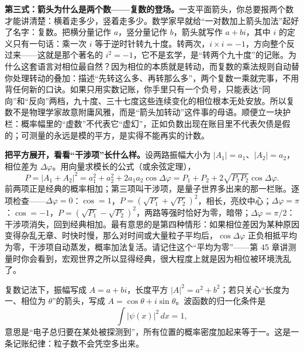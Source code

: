 
\textbf{第三式：箭头为什么是两个数——复数的登场。}一支平面箭头，你总要报两个数才能讲清楚：横着走多少，竖着走多少。数学家早就给“一对数加上箭头加法”起好了名字：复数。把横分量记作 \(a\)，竖分量记作 \(b\)，箭头就写作 \(a + bi\)，其中 \(i\) 的定义只有一句话：乘一次 \(i\) 等于逆时针转九十度。转两次，\(i \times i = -1\)，方向整个反过来——这就是那个著名的 \(i^2 = -1\)，它不是玄学，是“转两个九十度”的记账。为什么这套语言对相位最自然？因为相位的本质就是转动，而复数的乘法规则自动替你处理转动的叠加：描述“先转这么多、再转那么多”，两个复数一乘就完事，不用背任何新的口诀。如果只用实数记账，你手里只有一个负号，只能表达“同向”和“反向”两档，九十度、三十七度这些连续变化的相位根本无处安放。所以复数不是物理学家故意附庸风雅，而是“箭头加转动”这件事的母语。顺便立一块护栏：概率幅里的“虚数”不代表它“虚幻”，正如负数出现在账目里不代表欠债是假的；可测量的永远是模的平方，是实得不能再实的计数。

\begin{mathbridge}
\textbf{把平方展开，看看“干涉项”长什么样。}设两路振幅大小为 \(|A_1| = a_1\)、\(|A_2| = a_2\)，相位差为 \(\Delta\varphi\)。用向量求模长的公式（或余弦定理），
\[
P = |A_1 + A_2|^2 = a_1^2 + a_2^2 + 2a_1a_2\cos\Delta\varphi
   = P_1 + P_2 + 2\sqrt{P_1P_2}\cos\Delta\varphi.
\]
前两项正是经典的概率相加；第三项叫干涉项，是量子世界多出来的那一栏账。逐项检查——\(\Delta\varphi = 0\)：\(\cos = 1\)，\(P = (\sqrt{P_1}+\sqrt{P_2})^2\)，相长，亮纹中心；\(\Delta\varphi = \pi\)：\(\cos = -1\)，\(P = (\sqrt{P_1}-\sqrt{P_2})^2\)，两路等强时恰好为零，暗带；\(\Delta\varphi = \pi/2\)：干涉项消失，回到经典相加。最有意思的是第四种情形：如果相位差因为某种原因变得杂乱无章、时快时慢，那么对时间或大量粒子平均后，\(\cos\Delta\varphi\) 正负相抵平均为零，干涉项自动蒸发，概率加法复活。请记住这个“平均为零”——第 45 章讲测量时你会看到，宏观世界之所以显得经典，很大程度上就是因为相位被环境洗乱了。

复数记法下，振幅写成 \(A = a + bi\)，长度平方 \(|A|^2 = a^2 + b^2\)；若只关心“长度为一、相位为 \(\theta\)”的箭头，写成 \(A = \cos\theta + i\sin\theta\)。波函数的归一化条件是
\[
\int |\psi(x)|^2 \, dx = 1,
\]
意思是“电子总归要在某处被探测到”，所有位置的概率密度加起来等于一。这是一条记账纪律：粒子数不会凭空多出来。
\end{mathbridge}

